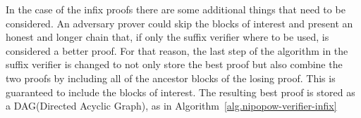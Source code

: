 



In the case of the infix proofs there are some additional things that need to
be considered. An adversary prover could skip the blocks of interest and
present an honest and longer chain that, if only the suffix verifier where to
be used, is considered a better proof. For that reason, the last step of the
algorithm in the suffix verifier is changed to not only store the best proof
but also combine the two proofs by including all of the ancestor blocks of the
losing proof. This is guaranteed to include the blocks of interest. The
resulting best proof is stored as a DAG(Directed Acyclic Graph), as in
Algorithm~\ref{alg.nipopow-verifier-infix}

